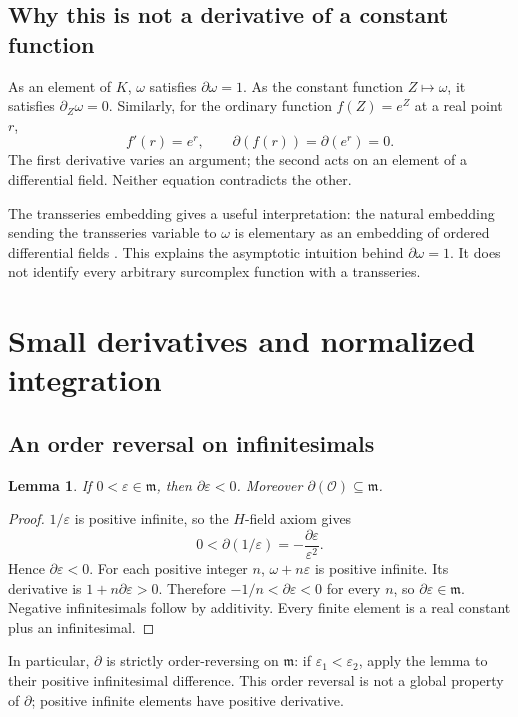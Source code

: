 \documentclass[11pt]{article}
\numberwithin{equation}{section}
\newtheorem{lemma}[theorem]{Lemma}
\theoremstyle{definition}
\newcommand{\OO}{\mathcal O}
\newcommand{\mm}{\mathfrak m}
\newcommand{\DD}{\partial}
\begin{document}
\subsection{Why this is not a derivative of a constant function}
As an element of $K$, $\omega$ satisfies $\DD\omega=1$. As the constant
function $Z\mapsto\omega$, it satisfies $\partial_Z\omega=0$. Similarly,
for the ordinary function $f(Z)=e^Z$ at a real point $r$,
\[
 f'(r)=e^r,\qquad \DD(f(r))=\DD(e^r)=0.
\]
The first derivative varies an argument; the second acts on an element of a
differential field. Neither equation contradicts the other.

The transseries embedding gives a useful interpretation: the natural
embedding sending the transseries variable to $\omega$ is elementary as an
embedding of ordered differential fields \cite[Theorem 1]{ADHsurreal}.
This explains the asymptotic intuition behind $\DD\omega=1$. It does not
identify every arbitrary surcomplex function with a transseries.

\section{Small derivatives and normalized integration}
\label{sec:integration}

\subsection{An order reversal on infinitesimals}
\begin{lemma}\label{lem:smallnegative}
If $0<\varepsilon\in\mm$, then $\DD\varepsilon<0$. Moreover
$\DD(\OO)\subseteq\mm$.
\end{lemma}
\begin{proof}
$1/\varepsilon$ is positive infinite, so the $H$-field axiom gives
\[
 0<\DD(1/\varepsilon)=-\frac{\DD\varepsilon}{\varepsilon^2}.
\]
Hence $\DD\varepsilon<0$. For each positive integer $n$,
$\omega+n\varepsilon$ is positive infinite. Its derivative is
$1+n\DD\varepsilon>0$. Therefore
$-1/n<\DD\varepsilon<0$ for every $n$, so
$\DD\varepsilon\in\mm$. Negative infinitesimals follow by additivity.
Every finite element is a real constant plus an infinitesimal.
\end{proof}

In particular, $\DD$ is strictly order-reversing on $\mm$: if
$\varepsilon_1<\varepsilon_2$, apply the lemma to their positive
infinitesimal difference. This order reversal is not a global property of
$\DD$; positive infinite elements have positive derivative.
\end{document}
